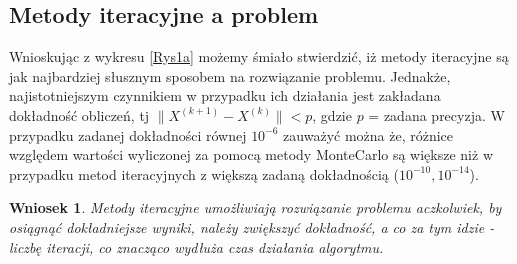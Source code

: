 \documentclass[10pt]{article}
\newtheorem{wn}{Wniosek}
\begin{document}
\subsection{Metody iteracyjne a problem}
Wnioskując z wykresu \ref{Rys1a} możemy śmiało stwierdzić, iż metody iteracyjne są jak najbardziej słusznym sposobem na rozwiązanie problemu. Jednakże, najistotniejszym czynnikiem w przypadku ich działania jest zakładana dokładność obliczeń, tj $\|{X^{(k+1)}-X^{(k)}}\| < p$, gdzie $p$ = zadana precyzja.
W przypadku zadanej dokładności równej $10^{-6}$ zauważyć można że, różnice względem wartości wyliczonej za pomocą metody MonteCarlo są większe niż w przypadku metod iteracyjnych z większą zadaną dokładnością ($10^{-10}, 10^{-14}$).
\begin{wn}
	Metody iteracyjne umożliwiają rozwiązanie problemu aczkolwiek, by osiągnąć dokładniejsze wyniki, należy zwiększyć dokładność, a co za tym idzie - liczbę iteracji, co znacząco wydłuża czas działania algorytmu.
\end{wn}
\end{document}
